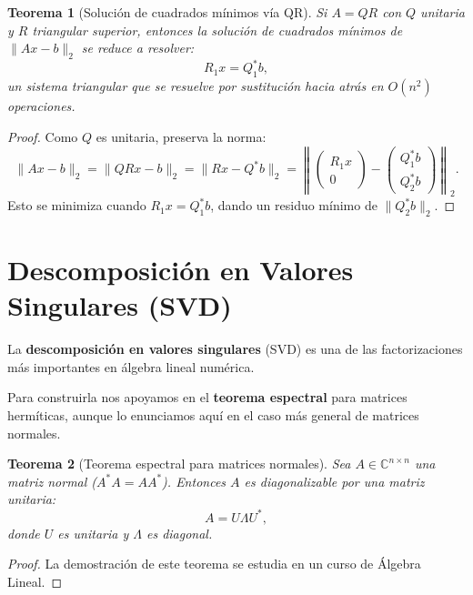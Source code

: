 \documentclass[a4paper,11pt]{report}
\newtheorem{theorem}{Teorema}[chapter]
\begin{document}
\begin{theorem}[Solución de cuadrados mínimos vía QR]
Si $A = QR$ con $Q$ unitaria y $R$ triangular superior, entonces la solución de cuadrados mínimos de $\|Ax - b\|_2$ se reduce a resolver:
\[
R_1 x = Q_1^* b,
\]
un sistema triangular que se resuelve por sustitución hacia atrás en $O(n^2)$ operaciones.
\end{theorem}

\begin{proof}
Como $Q$ es unitaria, preserva la norma:
\[
\|Ax - b\|_2 = \|QRx - b\|_2 = \|Rx - Q^*b\|_2 = \left\| \begin{pmatrix} R_1 x \\ 0 \end{pmatrix} - \begin{pmatrix} Q_1^* b \\ Q_2^* b \end{pmatrix} \right\|_2.
\]
Esto se minimiza cuando $R_1 x = Q_1^* b$, dando un residuo mínimo de $\|Q_2^* b\|_2$.
\end{proof}


\section{Descomposición en Valores Singulares (SVD)}

La \textbf{descomposición en valores singulares} (SVD) es una de las factorizaciones más importantes en álgebra lineal numérica.

Para construirla nos apoyamos en el \textbf{teorema espectral} para matrices hermíticas, aunque lo enunciamos aquí en el caso más general de matrices normales.

\begin{theorem}[Teorema espectral para matrices normales]\label{thm:spectral_qr_normal}
Sea $A \in \mathbb{C}^{n \times n}$ una matriz normal ($A^*A = AA^*$). Entonces $A$ es diagonalizable por una matriz unitaria:
\[
A = U\Lambda U^*,
\]
donde $U$ es unitaria y $\Lambda$ es diagonal.
\end{theorem}
\begin{proof}
La demostración de este teorema se estudia en un curso de Álgebra Lineal.
\end{proof}
\end{document}
